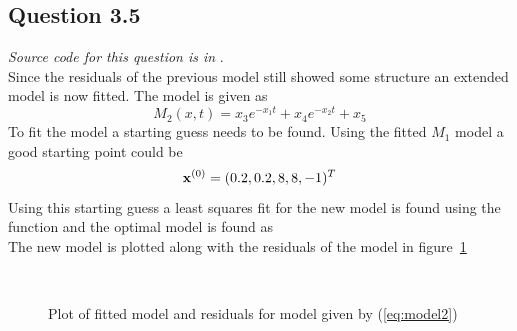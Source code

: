 \subsection*{Question 3.5}
\textit{Source code for this question is in }. \\
Since the residuals of the previous model still showed some structure an extended model is now fitted. The model is given as
\begin{equation}\label{eq:model2}
    M_2(x, t) = x_3 e^{-x_1t} + x_4 e^{-x_2 t} + x_5
\end{equation}
To fit the model a starting guess needs to be found. Using the fitted $M_1$ model a good starting point could be 
\begin{equation*}
    \mathbf{x}^{(0)} = (0.2, 0.2, 8, 8, -1)^T
\end{equation*}
Using this starting guess a least squares fit for the new model is found using the  function and the optimal model is found as
\begin{equation*}
    
\end{equation*}
The new model is plotted along with the residuals of the model in figure~\ref{fig:model2-plots}

\begin{figure}
    \centering
    \mbox{ \quad {}}
    \caption{Plot of fitted model and residuals for model given by (\ref{eq:model2})}
    \label{fig:model2-plots}
\end{figure}

